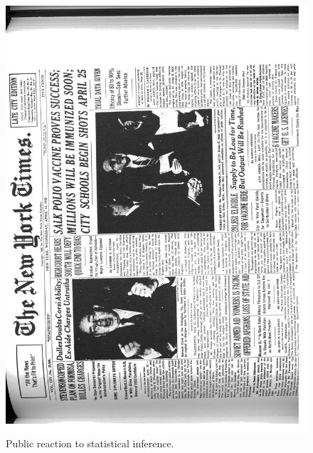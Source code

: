 \begin{figure}
\caption{Public reaction to statistical inference.}
\label{f_nytimes}

\includegraphics[width=150mm]{salk_nytimes}
\end{figure}
